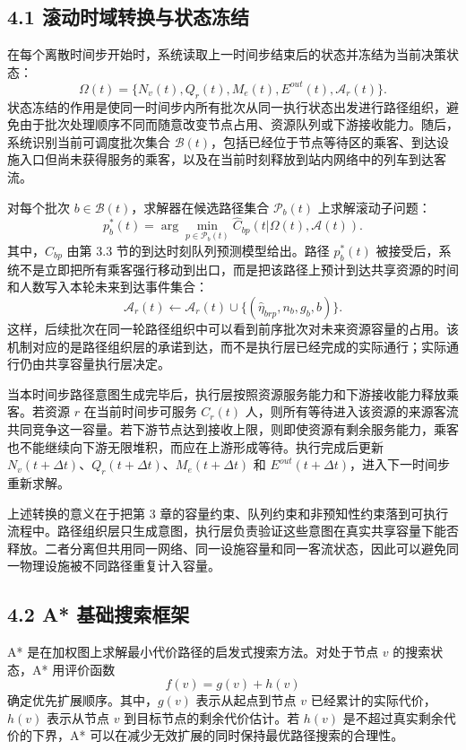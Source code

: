 \documentclass[UTF8,a4paper,12pt]{ctexart}
\begin{document}
\subsection{4.1 滚动时域转换与状态冻结}

在每个离散时间步开始时，系统读取上一时间步结束后的状态并冻结为当前决策状态：
\[
\Omega(t)=\{N_v(t),Q_r(t),M_e(t),E^{out}(t),\mathcal A_r(t)\}.
\]
状态冻结的作用是使同一时间步内所有批次从同一执行状态出发进行路径组织，避免由于批次处理顺序不同而随意改变节点占用、资源队列或下游接收能力。随后，系统识别当前可调度批次集合 \(\mathcal B(t)\)，包括已经位于节点等待区的乘客、到达设施入口但尚未获得服务的乘客，以及在当前时刻释放到站内网络中的列车到达客流。

对每个批次 \(b\in\mathcal B(t)\)，求解器在候选路径集合 \(\mathcal P_b(t)\) 上求解滚动子问题：
\[
p_b^{*}(t)=\arg\min_{p\in\mathcal P_b(t)}
\widehat C_{bp}(t|\Omega(t),\mathcal A(t)).
\]
其中，\(\widehat C_{bp}\) 由第 3.3 节的到达时刻队列预测模型给出。路径 \(p_b^{*}(t)\) 被接受后，系统不是立即把所有乘客强行移动到出口，而是把该路径上预计到达共享资源的时间和人数写入本轮未来到达事件集合：
\[
\mathcal A_r(t)\leftarrow
\mathcal A_r(t)\cup\{(\widehat\eta_{brp},n_b,g_b,b)\}.
\]
这样，后续批次在同一轮路径组织中可以看到前序批次对未来资源容量的占用。该机制对应的是路径组织层的承诺到达，而不是执行层已经完成的实际通行；实际通行仍由共享容量执行层决定。

当本时间步路径意图生成完毕后，执行层按照资源服务能力和下游接收能力释放乘客。若资源 \(r\) 在当前时间步可服务 \(C_r(t)\) 人，则所有等待进入该资源的来源客流共同竞争这一容量。若下游节点达到接收上限，则即使资源有剩余服务能力，乘客也不能继续向下游无限堆积，而应在上游形成等待。执行完成后更新 \(N_v(t+\Delta t)\)、\(Q_r(t+\Delta t)\)、\(M_e(t+\Delta t)\) 和 \(E^{out}(t+\Delta t)\)，进入下一时间步重新求解。

上述转换的意义在于把第 3 章的容量约束、队列约束和非预知性约束落到可执行流程中。路径组织层只生成意图，执行层负责验证这些意图在真实共享容量下能否释放。二者分离但共用同一网络、同一设施容量和同一客流状态，因此可以避免同一物理设施被不同路径重复计入容量。

\subsection{4.2 A* 基础搜索框架}

A* 是在加权图上求解最小代价路径的启发式搜索方法。对处于节点 \(v\) 的搜索状态，A* 用评价函数
\[
f(v)=g(v)+h(v)
\]
确定优先扩展顺序。其中，\(g(v)\) 表示从起点到节点 \(v\) 已经累计的实际代价，\(h(v)\) 表示从节点 \(v\) 到目标节点的剩余代价估计。若 \(h(v)\) 是不超过真实剩余代价的下界，A* 可以在减少无效扩展的同时保持最优路径搜索的合理性。
\end{document}
